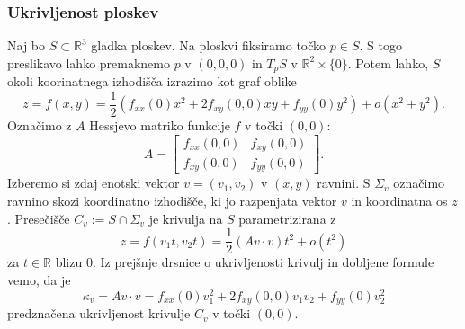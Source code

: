 \documentclass[8pt]{beamer}
\theoremstyle{definition}
\theoremstyle{remark}
\theoremstyle{plain}
\numberwithin{equation}{section}  %
\begin{document}
\begin{frame}
    \frametitle{Ukrivljenost ploskev}

    Naj bo $S \subset \mathbb{R}^3$ gladka ploskev. Na ploskvi fiksiramo točko $p \in S$. S togo preslikavo lahko premaknemo $p$ v $(0,0,0)$ in $T_p S$ v $\mathbb{R}^2 \times\{0\}$. Potem lahko, $S$ okoli koorinatnega izhodišča izrazimo kot graf oblike 
    \begin{equation*}
        z=f(x, y)=\frac{1}{2}\left(f_{x x}(0) x^2+2 f_{x y}(0,0) x y+f_{y y}(0) y^2\right)+o\left(x^2+y^2\right). 
    \end{equation*}
    Označimo z $A$ Hessjevo matriko funkcije $f$ v točki $(0,0)$:
    \begin{equation*}
        A=\begin{bmatrix}
            f_{x x}(0,0) & f_{x y}(0,0) \\
            f_{x y}(0,0) & f_{y y}(0,0)
        \end{bmatrix} .
    \end{equation*}
    Izberemo si zdaj enotski vektor $v=\left(v_1, v_2\right)$ v $(x,y)$ ravnini. S $\Sigma_v$ označimo ravnino skozi koordinatno izhodišče, ki jo razpenjata vektor $v$ in koordinatna os $z$. Presečišče $C_v:=S \cap \Sigma_v$ je krivulja na $S$ parametrizirana z
    \begin{equation*}
        z=f\left(v_1 t, v_2 t\right)=\frac{1}{2}(A v \cdot v) t^2+o\left(t^2\right)
    \end{equation*}
    za $t \in \mathbb{R}$ blizu $0$. Iz prejšnje drsnice o ukrivljenosti krivulj in dobljene formule vemo, da je 
    \begin{equation*}
        \kappa_v=A v \cdot v=f_{x x}(0) v_1^2+2 f_{x y}(0,0) v_1 v_2+f_{y y}(0) v_2^2
    \end{equation*}
    predznačena ukrivljenost krivulje $C_v$ v točki $(0,0)$.
    
\end{frame}
\end{document}
